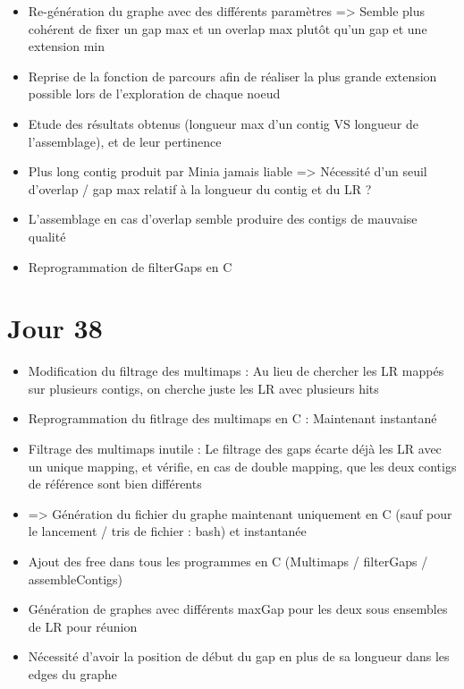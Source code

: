 \documentclass[12pt]{report}
\begin{document}
\begin{itemize}
	\item Re-génération du graphe avec des différents paramètres => Semble plus cohérent de fixer un gap max et un overlap max
	plutôt qu'un gap et une extension min

	\item Reprise de la fonction de parcours afin de réaliser la plus grande extension possible lors de l'exploration de chaque noeud
	
	\item Etude des résultats obtenus (longueur max d'un contig VS longueur de l'assemblage), et de leur pertinence
	
	\item Plus long contig produit par Minia jamais liable => Nécessité d'un seuil d'overlap / gap max relatif à la longueur du contig et du LR ?
	
	\item L'assemblage en cas d'overlap semble produire des contigs de mauvaise qualité
	
	\item Reprogrammation de filterGaps en C
\end{itemize}

\section{Jour 38}

\begin{itemize}
	\item Modification du filtrage des multimaps : Au lieu de chercher les LR mappés sur plusieurs contigs, on cherche juste les LR avec
	plusieurs hits 
	
	\item Reprogrammation du fitlrage des multimaps en C : Maintenant instantané 
	
	\item Filtrage des multimaps inutile : Le filtrage des gaps écarte déjà les LR avec un unique mapping, et vérifie, en cas de double
	mapping, que les deux contigs de référence sont bien différents
	
	\item => Génération du fichier du graphe maintenant uniquement en C (sauf pour le lancement / tris de fichier : bash) et instantanée
	
	\item Ajout des free dans tous les programmes en C (Multimaps / filterGaps / assembleContigs)
	
	\item Génération de graphes avec différents maxGap pour les deux sous ensembles de LR pour réunion
	
	\item Nécessité d'avoir la position de début du gap en plus de sa longueur dans les edges du graphe
\end{itemize}
\end{document}
